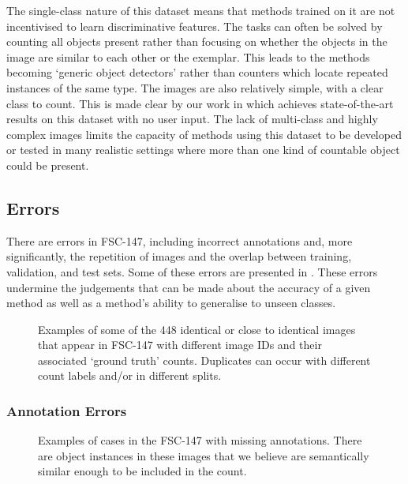 \documentclass[../thesis.tex]{subfiles}
\begin{document}
The single-class nature of this dataset means that methods trained on it are not incentivised to learn discriminative features. 
The tasks can often be solved by counting all objects present rather than focusing on whether the objects in the image are similar to each other or the exemplar. 
This leads to the methods becoming `generic object detectors' rather than counters which locate repeated instances of the same type.
The images are also relatively simple, with a clear class to count. This is made clear by our work in  which achieves state-of-the-art results on this dataset with no user input. 
The lack of multi-class and highly complex images 
limits the capacity of methods using this dataset to be developed or tested in many realistic settings where more than one kind of countable object could be present.


\subsection{Errors}
There are errors in FSC-147, including incorrect annotations and, more significantly, the repetition of images and the overlap between training, validation, and test sets. Some of these errors are presented in .
These errors undermine the judgements that can be made about the accuracy of a given method as well as a method's ability to generalise to unseen classes.


\begin{figure}
    \centering
    
    \caption{Examples of some of the 448 identical or close to identical images that appear in FSC-147 with different image IDs and their associated `ground truth' counts. Duplicates can occur with different count labels and/or in different splits.}
    \label{fig__FSC133__subset_dupes}
\end{figure}


\subsubsection{Annotation Errors}

\begin{figure}    
    \centering
    \fontsize{8}{8}\selectfont
    
    \caption{Examples of cases in the FSC-147  with missing annotations. There are object instances in these images that we believe are semantically similar enough to be included in the count.}
    \label{fig__FSC133__Fig_annotation_errors_missing}
\end{figure}
\end{document}
